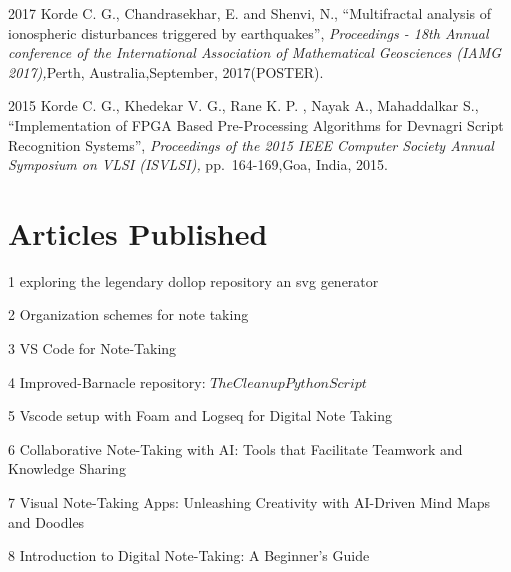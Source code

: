 \documentclass[fontsize=11pt]{tccv}
\begin{document}
\begin{publi}
\item{2017} {  Korde C. G., Chandrasekhar, E. and Shenvi, N., \textquotedblleft Multifractal analysis of ionospheric disturbances triggered by earthquakes\textquotedblright, \textit{Proceedings - 18th Annual conference of the International Association of Mathematical Geosciences (IAMG 2017),}Perth, Australia,September, 2017(POSTER).\qquad }
\vspace{1em}

\item{2015} {Korde C. G., Khedekar V. G., Rane K. P. , Nayak A., Mahaddalkar S., \textquotedblleft Implementation of FPGA Based Pre-Processing Algorithms for Devnagri Script Recognition Systems\textquotedblright, \textit{Proceedings of the 2015 IEEE Computer Society Annual Symposium on VLSI (ISVLSI),} pp.~164-169,Goa, India, 2015.\qquad }
\end{publi}
\vspace{1em}

\section{Articles Published} 

\begin{publi}

    \item{1} {exploring the legendary dollop repository an svg generator} \vspace{1em}
    \item{2} {Organization schemes for note taking} \vspace{1em}
    \item{3} {VS Code for Note-Taking} \vspace{1em}
    \item{4} {Improved-Barnacle repository: \(The Cleanup Python Script\)} \vspace{1em}
    \item{5} {Vscode setup with Foam and Logseq for Digital Note Taking} \vspace{1em}
    \item{6} {Collaborative Note-Taking with AI: Tools that Facilitate Teamwork and Knowledge Sharing} \vspace{1em}
    \item{7} {Visual Note-Taking Apps: Unleashing Creativity with AI-Driven Mind Maps and Doodles} \vspace{1em}
    \item{8} {Introduction to Digital Note-Taking: A Beginner's Guide}\vspace{1em}
   
\end{publi}
\vspace{1em}
\end{document}
